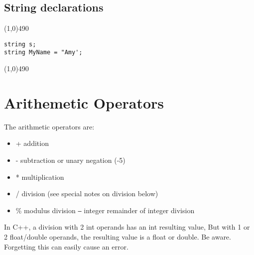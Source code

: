 \documentclass{report}
\begin{document}
    \subsection{String declarations}
    \bigbreak \noindent 
    \line(1,0){490}
    \begin{verbatim}
string s;
string MyName = "Amy';
    \end{verbatim}
    \line(1,0){490}


        \pagebreak \bigbreak \noindent 
        \section{\LARGE Arithemetic Operators}
        \bigbreak \noindent 
        The arithmetic operators are:
        \bigbreak \noindent 
        \begin{itemize}
            \item +  addition
            \item -  subtraction or unary negation (-5)
            \item *  multiplication
            \item /  division (see special notes on division below)
            \item \%  modulus division \texttt{--} integer remainder of integer division
        \end{itemize}
        \bigbreak \noindent 
        \bigbreak \noindent 
        In C++, a division with 2 int operands has an int resulting value, But with 1 or 2 float/double operands, the resulting value is a float or double. Be aware. Forgetting this can easily cause an error.
        \bigbreak \noindent \bigbreak \noindent 
\end{document}
